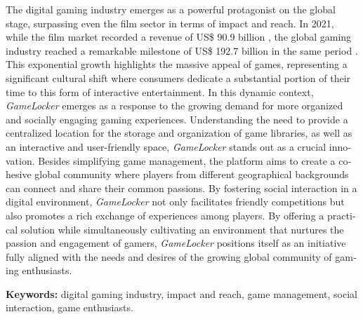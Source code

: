 \begin{resumo}[Abstract]
 \begin{otherlanguage}{english}

 The digital gaming industry emerges as a powerful protagonist on the global stage, surpassing even the film sector in terms of impact and reach. In 2021, while the film market recorded a revenue of US\$ 90.9 billion \cite{global_films_musics_market}, the global gaming industry reached a remarkable milestone of US\$ 192.7 billion in the same period \cite{global_games_market}. This exponential growth highlights the massive appeal of games, representing a significant cultural shift where consumers dedicate a substantial portion of their time to this form of interactive entertainment. In this dynamic context, \textit{GameLocker} emerges as a response to the growing demand for more organized and socially engaging gaming experiences. Understanding the need to provide a centralized location for the storage and organization of game libraries, as well as an interactive and user-friendly space, \textit{GameLocker} stands out as a crucial innovation. Besides simplifying game management, the platform aims to create a cohesive global community where players from different geographical backgrounds can connect and share their common passions. By fostering social interaction in a digital environment, \textit{GameLocker} not only facilitates friendly competitions but also promotes a rich exchange of experiences among players. By offering a practical solution while simultaneously cultivating an environment that nurtures the passion and engagement of gamers, \textit{GameLocker} positions itself as an initiative fully aligned with the needs and desires of the growing global community of gaming enthusiasts.

    \vspace{\onelineskip}

    \noindent 
    \textbf{Keywords:} digital gaming industry, impact and reach, game management, social interaction, game enthusiasts.
    \end{otherlanguage}
 
\end{resumo}

\pagebreak